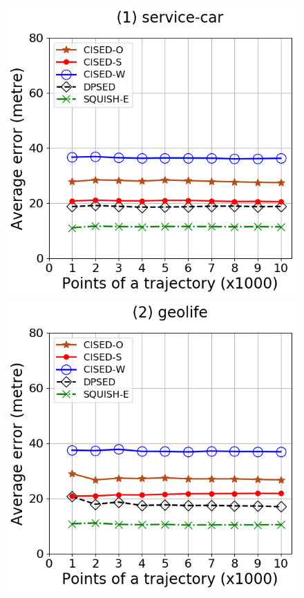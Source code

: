 \begin{figure}[tb!]
\centering
\includegraphics[scale = 0.30]{Figures/Exp-error-size-service.png}
\includegraphics[scale = 0.30]{Figures/Exp-error-size-geolife.png}

\end{figure}
